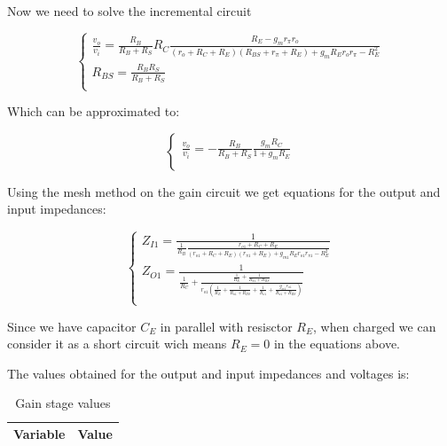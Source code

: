 Now we need to solve the incremental circuit

\begin{equation}\label{eq:v1}
\begin{cases}
\frac{v_o}{v_i}=\frac{R_B}{R_B+R_S} R_C \frac{R_E-g_m r_\pi r_o}{(r_o+R_C+R_E)(R_{BS}+r_\pi+R_E)+g_m R_E r_o r_\pi - R_E^2}\\
R_{BS}=\frac{R_B R_S}{R_B+R_S}\\
\end{cases}
\end{equation}

Which can be approximated to:

\begin{equation}\label{eq:vs1}
\begin{cases}
\frac{v_o}{v_i}=-\frac{R_B}{R_B+R_S} \frac{g_m R_C}{1+g_m R_E}\\
\end{cases}
\end{equation}

 Using the mesh method on the gain circuit we get equations for the output and input impedances:
 
 \begin{equation}\label{eq:Z1}
\begin{cases}
Z_{I1}=\frac{1}{\frac{1}{R_B} \frac{r_{o1}+R_{C}+R_{E}}{(r_{o1}+R_{C}+R_{E})(r_{\pi 1}+R_{E})+g_{m1} R_{E} r_{o1} r_{\pi 1} - R_{E}^2}}\\
Z_{O1}= \frac{1}{\frac{1}{R_C} +\frac{\frac{1}{R_E}+\frac{1}{R_{\pi 1}+R_{BS}}}{r_{o1}(\frac{1}{R_E}+\frac{1}{R_{\pi 1}+R_{BS}}+\frac{1}{R_{o1}}+ \frac{g_{m1} r_{\pi 1}}{R_{\pi 1}+R_{BS}})}}\\
\end{cases}
\end{equation}

 Since we have capacitor $C_E$ in parallel with resisctor $R_E$, when charged we can consider it as a short circuit wich means $R_E=0$ in the equations above.
 \par
The values obtained for the output and input impedances and voltages is:

\begin{table}[H]
  \centering
  \begin{tabular}{|l|r|}
    \hline    
    {\bf Variable} & {\bf Value} \\ \hline
    
  \end{tabular}
  \caption{Gain stage values}
  \label{tab:sim1}
\end{table}


